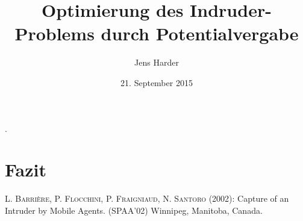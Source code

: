 \documentclass[12pt, a4paper, german]{article}
\author{Jens Harder}
\date{21. September 2015}
\title{Optimierung des Indruder-Problems durch Potentialvergabe}
\begin{document}
	\maketitle
	\newpage
	
	.
	\tableofcontents
	
	\newpage
	
	
	
	

	
	
	\section{Fazit}
	
	\newpage

	\renewcommand{\refname}{Literaturquellen}
	
	\begin{thebibliography}{99}
		
		
		 \textsc{L. Barrière, P. Flocchini, P. Fraigniaud, N. Santoro} (2002): Capture of an Intruder by Mobile Agents. (SPAA'02) Winnipeg, Manitoba, Canada.

		
	\end{thebibliography} 
	
	
\end{document}
